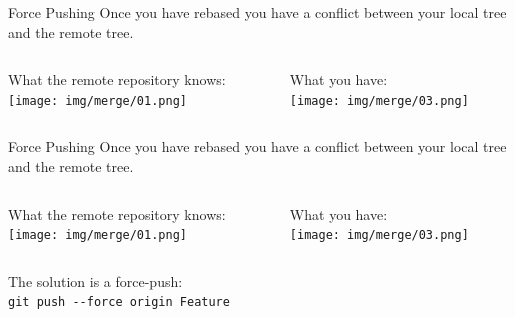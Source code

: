 \documentclass[usenames,dvipsnames,9pt]{beamer}
\begin{document}
%
\begin{frame}{Force Pushing}
  Once you have rebased you have a conflict between your local tree and the remote tree.
  \vspace{1cm}
  \begin{columns}
    \begin{column}{0.5\textwidth}
      \centering
      What the remote repository knows:\\
      \texttt{[image: img/merge/01.png]}
    \end{column}
    \begin{column}{0.5\textwidth}
      \centering
      What you have:\\
      \texttt{[image: img/merge/03.png]}
      \vspace{-0.5cm}
    \end{column}
  \end{columns}
  \vspace{2.05cm}
\end{frame}

%
\begin{frame}{Force Pushing}
  Once you have rebased you have a conflict between your local tree and the remote tree.
  \vspace{1cm}
  \begin{columns}
    \begin{column}{0.5\textwidth}
      \centering
      What the remote repository knows:\\
      \texttt{[image: img/merge/01.png]}
    \end{column}
    \begin{column}{0.5\textwidth}
      \centering
      What you have:\\
      \texttt{[image: img/merge/03.png]}
      \vspace{-0.5cm}
    \end{column}
  \end{columns}

  \vspace{1cm}
  The solution is a force-push:\\
  \lstinline|git push --force origin Feature|
\end{frame}
\end{document}
